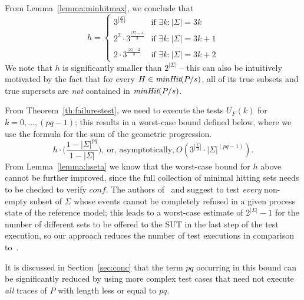 %
From Lemma~\ref{lemma:minhitmax}, we conclude that
$$h=\begin{cases}
3^{|\frac{\Sigma}{3}|} &\text{if}\,\, \exists k: |\Sigma|=3k\\
2^2\cdot 3^{\frac{|\Sigma|-4}{3}} &\text{if}\,\, \exists k : |\Sigma| =3k+1\\
2\cdot 3^{\frac{|\Sigma| - 2}{3}} &\text{if}\,\, \exists k: |\Sigma| =3k+2
\end{cases}
$$
%
We note that $h$ is significantly smaller than $2^{|\Sigma|}$ -- this can
also be intuitively motivated by the fact that  for every $H\in
\text{\it minHit}(P/s)$, all of its true subsets and true supersets are {\it not}
contained in $\text{\it minHit}(P/s)$.

From Theorem~\ref{th:failurestest}, we need to execute the tests $U_F(k)$ for
$k = 0,\dots,(pq-1)$; this results in a worst-case bound defined below, where
we use the formula for the sum of the geometric progression.
%
\[
h\cdot \big( \frac{1-|\Sigma|^{pq}}{1-|\Sigma|} \big),\
 \text{or, asymptotically,}\  O(3^{|\frac{\Sigma}{3}|}\cdot|\Sigma|^{(pq-1)}).
 \]
%
From Lemma~\ref{lemma:hseta} we know that the worst-case bound for $h$
above cannot be further improved, since the full collection of minimal
hitting sets needs to be checked to verify $conf$. The
authors of~\cite{Hennessy:1988:ATP:50497} and
\cite{DBLP:conf/icfem/CavalcantiG07} suggest to test {\it every} non-empty
subset of $\Sigma$ whose events cannot be completely refused in a given
process state of the reference model; this leads to a worst-case estimate of
$2^{|\Sigma|}-1$ for the number of different sets to be offered to the SUT in
the last step of the test execution, so our approach reduces the number of
test executions in comparison
to~\cite{Hennessy:1988:ATP:50497,DBLP:conf/icfem/CavalcantiG07}.

It is discussed in Section~\ref{sec:conc} that the term $pq$ occurring in
this bound can be significantly reduced by using more complex test cases that
need not execute {\it all} traces of $P$ with length less or equal to $pq$.

